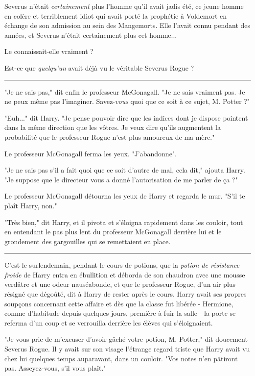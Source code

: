 Severus n'était \emph{certainement}  plus l'homme qu'il avait jadis été, ce jeune homme en colère et terriblement idiot qui avait porté la prophétie à Voldemort en échange de son admission au sein des Mangemorts. Elle l'avait connu pendant des années, et Severus n'était certainement plus cet homme...

Le connaissait-elle vraiment ?

Est-ce que \emph{quelqu'un}  avait déjà vu le véritable Severus Rogue ?
\par\noindent\rule{\textwidth}{0.4pt}
"Je ne sais pas," dit enfin le professeur McGonagall. "Je ne sais vraiment pas. Je ne peux même pas l'imaginer. Savez-\emph{vous } quoi que ce soit à ce sujet, M. Potter ?"

"Euh..." dit Harry. "Je pense pouvoir dire que les indices dont je dispose pointent dans la même direction que les vôtres. Je veux dire qu'ils augmentent la probabilité que le professeur Rogue n'est plus amoureux de ma mère."

Le professeur McGonagall ferma les yeux. "J'abandonne".

"Je ne sais pas s'il a fait quoi que ce soit d'autre de mal, cela dit," ajouta Harry. "Je suppose que le directeur vous a donné l'autorisation de me parler de ça ?"

Le professeur McGonagall détourna les yeux de Harry et regarda le mur. "S'il te plaît Harry, non."

"Très bien," dit Harry, et il pivota et s'éloigna rapidement dans les couloir, tout en entendant le pas plus lent du professeur McGonagall derrière lui et le grondement des gargouilles qui se remettaient en place.
\par\noindent\rule{\textwidth}{0.4pt}
C'est le surlendemain, pendant le cours de potions, que la \emph{potion de résistance froide}  de Harry entra en ébullition et déborda de son chaudron avec une mousse verdâtre et une odeur nauséabonde, et que le professeur Rogue, d'un air plus résigné que dégoûté, dit à Harry de rester après le cours. Harry avait ses propres soupçons concernant cette affaire et dès que la classe fut libérée - Hermione, comme d'habitude depuis quelques jours, première à fuir la salle - la porte se referma d'un coup et se verrouilla derrière les élèves qui s'éloignaient.

"Je vous prie de m'excuser d'avoir gâché votre potion, M. Potter," dit doucement Severus Rogue. Il y avait sur son visage l'étrange regard triste que Harry avait vu chez lui quelques temps auparavant, dans un couloir. "Vos notes n'en pâtiront pas. Asseyez-vous, s'il vous plaît."

